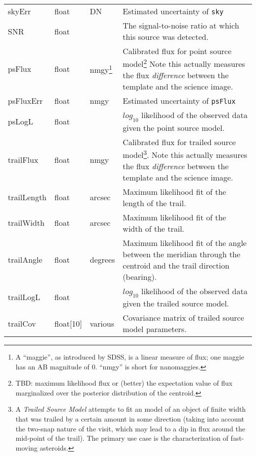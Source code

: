 \documentclass[12pt]{article}
\begin{document}
\begin{center}
\begin{longtable}{p{3cm}p{2cm}p{2cm}p{5cm}}
skyErr & float & DN & Estimated uncertainty of \texttt{sky} \\ 

SNR & float & ~ & The signal-to-noise ratio at which this source was detected. \\

psFlux & float & nmgy\footnote{A ``maggie'', as introduced by SDSS, is a linear measure of flux; one maggie has an AB magnitude of 0. ``nmgy'' is short for nanomaggies.} & Calibrated flux for point source model\footnote{TBD: maximum likelihood flux or (better) the expectation value of flux marginalized over the posterior distribution of the centroid.}  Note this actually measures the flux {\em difference} between the template and the science image. \\ 

psFluxErr & float & nmgy & Estimated uncertainty of \texttt{psFlux} \\ 

psLogL & float & ~ & $log_{10}$ likelihood of the observed data given the point source model. \\ 

trailFlux & float & nmgy & Calibrated flux for trailed source model\footnote{A {\em Trailed Source Model} attempts to fit an model of an object of finite width that was trailed by a certain amount in some direction (taking into account the two-snap nature of the visit, which may lead to a dip in flux around the mid-point of the trail). The primary use case is the characterization of fast-moving asteroids.}. Note this actually measures the flux {\em difference} between the template and the science image. \\ 

trailLength & float & arcsec & Maximum likelihood fit of the length of the trail. \\ 

trailWidth & float & arcsec & Maximum likelihood fit of the width of the trail. \\ 

trailAngle & float & degrees & Maximum likelihood fit of the angle between the meridian through the centroid and the trail direction (bearing). \\ 

trailLogL & float & ~ & $log_{10}$ likelihood of the observed data given the trailed source model. \\ 

trailCov & float[10] & various & Covariance matrix of trailed source model parameters. \\ 


\end{longtable}
\end{center}
\end{document}
